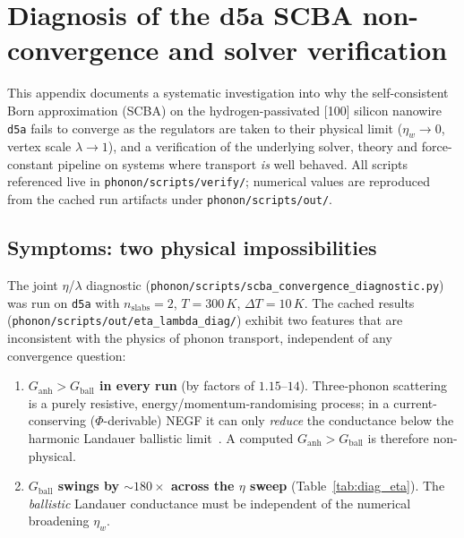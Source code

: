 \chapter{Diagnosis of the d5a SCBA non-convergence and solver verification}
\label{app:convergence_diagnosis}

This appendix documents a systematic investigation into why the self-consistent
Born approximation (SCBA) on the hydrogen-passivated [100] silicon nanowire
\texttt{d5a} fails to converge as the regulators are taken to their physical
limit ($\eta_w\!\to\!0$, vertex scale $\lambda\!\to\!1$), and a verification of the
underlying solver, theory and force-constant pipeline on systems where transport
\emph{is} well behaved. All scripts referenced live in
\texttt{phonon/scripts/verify/}; numerical values are reproduced from the cached
run artifacts under \texttt{phonon/scripts/out/}.

\section{Symptoms: two physical impossibilities}
\label{sec:diag_symptoms}

The joint $\eta$/$\lambda$ diagnostic
(\texttt{phonon/scripts/scba\_convergence\_diagnostic.py}) was run on \texttt{d5a}
with $n_\text{slabs}=2$, $T=300\,K$, $\Delta T=10\,K$. The cached
results (\texttt{phonon/scripts/out/eta\_lambda\_diag/}) exhibit two features that
are inconsistent with the physics of phonon transport, independent of any
convergence question:

\begin{enumerate}
  \item \textbf{$G_\text{anh} > G_\text{ball}$ in every run} (by factors of
        $1.15$--$14$). Three-phonon scattering is a purely resistive,
        energy/momentum-randomising process; in a current-conserving
        ($\Phi$-derivable) NEGF it can only \emph{reduce} the conductance below the
        harmonic Landauer ballistic limit~\cite{luisier_atomistic_2012,
        wang_quantum_2008, mingo_anharmonic_2006}. A computed $G_\text{anh}>G_\text{ball}$ is
        therefore non-physical.
  \item \textbf{$G_\text{ball}$ swings by ${\sim}180\times$ across the $\eta$
        sweep} (Table~\ref{tab:diag_eta}). The \emph{ballistic} Landauer
        conductance must be independent of the numerical broadening $\eta_w$.
\end{enumerate}


